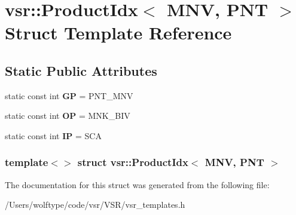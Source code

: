 \hypertarget{structvsr_1_1_product_idx_3_01_m_n_v_00_01_p_n_t_01_4}{\section{vsr\-:\-:Product\-Idx$<$ M\-N\-V, P\-N\-T $>$ Struct Template Reference}
\label{structvsr_1_1_product_idx_3_01_m_n_v_00_01_p_n_t_01_4}
}
\subsection*{Static Public Attributes}
\begin{DoxyCompactItemize}
\item 
\hypertarget{structvsr_1_1_product_idx_3_01_m_n_v_00_01_p_n_t_01_4_a1bd188158eb598109a825bf48868ace2}{static const int {\bfseries G\-P} = P\-N\-T\-\_\-\-M\-N\-V}\label{structvsr_1_1_product_idx_3_01_m_n_v_00_01_p_n_t_01_4_a1bd188158eb598109a825bf48868ace2}

\item 
\hypertarget{structvsr_1_1_product_idx_3_01_m_n_v_00_01_p_n_t_01_4_aa3fb66bf06ba4e845526fc39d6d7e6d6}{static const int {\bfseries O\-P} = M\-N\-K\-\_\-\-B\-I\-V}\label{structvsr_1_1_product_idx_3_01_m_n_v_00_01_p_n_t_01_4_aa3fb66bf06ba4e845526fc39d6d7e6d6}

\item 
\hypertarget{structvsr_1_1_product_idx_3_01_m_n_v_00_01_p_n_t_01_4_ac86a78e27d15da1193a64b8f11965d59}{static const int {\bfseries I\-P} = S\-C\-A}\label{structvsr_1_1_product_idx_3_01_m_n_v_00_01_p_n_t_01_4_ac86a78e27d15da1193a64b8f11965d59}

\end{DoxyCompactItemize}
\subsubsection*{template$<$$>$ struct vsr\-::\-Product\-Idx$<$ M\-N\-V, P\-N\-T $>$}



The documentation for this struct was generated from the following file\-:\begin{DoxyCompactItemize}
\item 
/\-Users/wolftype/code/vsr/\-V\-S\-R/vsr\-\_\-templates.\-h\end{DoxyCompactItemize}
